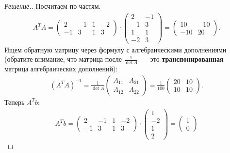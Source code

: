 \documentclass[a4paper]{article}
\theoremstyle{remark}
\begin{document}
\begin{proof}[Решение.]
        Посчитаем по частям.
        \begin{align*}
          A^TA = \begin{pmatrix}
            2 & -1 & 1 & -2 \\
            -1 & 3 & 1 & 3
          \end{pmatrix} \cdot \begin{pmatrix}
            2 & -1 \\
            -1 & 3 \\
            1 & 1 \\
            -2 & 3
          \end{pmatrix} = \begin{pmatrix}
            10 & -10 \\
            -10 & 20
          \end{pmatrix}.
        \end{align*}
        Ищем обратную матрицу через формулу с алгебраическими дополнениями (обратите внимание, что матрица после $\frac{1}{\det A}$~--- это \textbf{транспонированная} матрица алгебраических дополнений):
        \begin{align*}
          (A^TA)^{-1} = 
          \frac{1}{\det A} \begin{pmatrix}
            A_{11} & A_{21} \\
            A_{12} & A_{22}  
          \end{pmatrix} = 
          \frac{1}{100} \begin{pmatrix}
            20 & 10 \\
            10 & 10
          \end{pmatrix}.
        \end{align*}
        Теперь $A^T b$:
        \begin{align*}
          A^T b = \begin{pmatrix}
            2 & -1 & 1 & -2 \\
            -1 & 3 & 1 & 3
          \end{pmatrix} \cdot \begin{pmatrix}
            1 \\
            -2 \\
            1 \\
            2
          \end{pmatrix} =
          \begin{pmatrix}
            1 \\
            0
          \end{pmatrix}
        \end{align*}

\end{proof}
\end{document}
